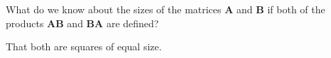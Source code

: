 
%
%
%

	What do we know about the sizes of the matrices $\mathbf{A}$ and $\mathbf{B}$ if both of the products $\mathbf{AB}$ and $\mathbf{BA}$ are defined?

\solution
	That both are squares of equal size.
